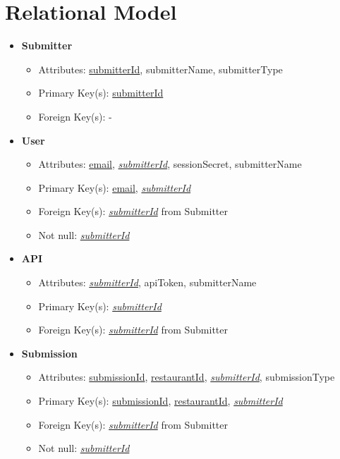 \documentclass{article}
\begin{document}
\section{Relational Model}
    \begin{itemize}
        \item \textbf{Submitter}        
        \begin{itemize}
            \item Attributes: \underline{submitterId}, submitterName, submitterType
            \item Primary Key(s): \underline{submitterId}
            \item Foreign Key(s): -
        \end{itemize}

        \item \textbf{User}
        \begin{itemize}
            \item Attributes: \underline{email}, \underline{\textit{submitterId}}, sessionSecret, submitterName
            \item Primary Key(s): \underline{email}, \underline{\textit{submitterId}}
            \item Foreign Key(s): \underline{\textit{submitterId}} from Submitter
            \item Not null: \underline{\textit{submitterId}}
        \end{itemize}

        \item \textbf{API}
        \begin{itemize}
            \item Attributes: \underline{\textit{submitterId}}, apiToken, submitterName
            \item Primary Key(s): \underline{\textit{submitterId}}
            \item Foreign Key(s): \underline{\textit{submitterId}} from Submitter
        \end{itemize}

        \item \textbf{Submission}                
        \begin{itemize}
            \item Attributes: \underline{submissionId}, \underline{restaurantId}, \underline{\textit{submitterId}}, submissionType
            \item Primary Key(s): \underline{submissionId}, \underline{restaurantId}, \underline{\textit{submitterId}}
            \item Foreign Key(s): \underline{\textit{submitterId}} from Submitter
            \item Not null: \underline{\textit{submitterId}}
        \end{itemize}


\end{itemize}
\end{document}
